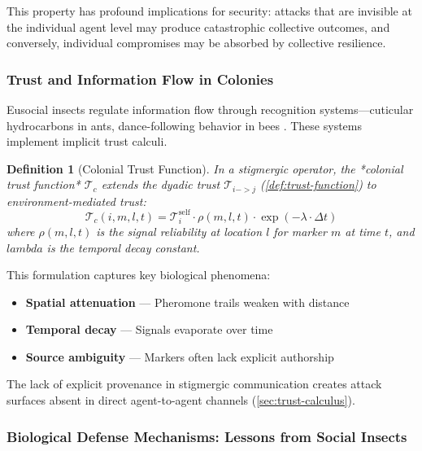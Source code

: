 \documentclass[
]{article}
\providecommand{\tightlist}{%
  \setlength{\itemsep}{0pt}\setlength{\parskip}{0pt}}
\newtheorem{definition}{Definition}[section]
\begin{document}
This property has profound implications for security: attacks that are
invisible at the individual agent level may produce catastrophic
collective outcomes, and conversely, individual compromises may be
absorbed by collective resilience.

\subsubsection{Trust and Information Flow in
Colonies}\label{sec:colony-trust}

Eusocial insects regulate information flow through recognition
systems---cuticular hydrocarbons in ants, dance-following behavior in
bees \citep{lenoir2001chemical}. These systems implement implicit trust
calculi.

\begin{definition}[Colonial Trust Function]
\label{def:colonial-trust}
In a stigmergic operator, the *colonial trust function* $\mathcal{T}_c$ extends the dyadic trust $\mathcal{T}_{i -> j}$ (\cref{def:trust-function}) to environment-mediated trust:
\begin{equation}
\label{eq:colonial-trust}
\mathcal{T}_{c}(i, m, l, t) = \mathcal{T}_{i}^{\text{self}} \cdot \rho(m, l, t) \cdot \exp(-\lambda \cdot \Delta t)
\end{equation}
where $\rho(m, l, t)$ is the signal reliability at location $l$ for marker $m$ at time $t$, and $lambda$ is the temporal decay constant.
\end{definition}

This formulation captures key biological phenomena:

\begin{itemize}
\tightlist
\item
  \textbf{Spatial attenuation} --- Pheromone trails weaken with distance
\item
  \textbf{Temporal decay} --- Signals evaporate over time
\item
  \textbf{Source ambiguity} --- Markers often lack explicit authorship
\end{itemize}

The lack of explicit provenance in stigmergic communication creates
attack surfaces absent in direct agent-to-agent channels
(\cref{sec:trust-calculus}).

\subsubsection{Biological Defense Mechanisms: Lessons from Social
Insects}\label{sec:biological-defenses}
\end{document}
